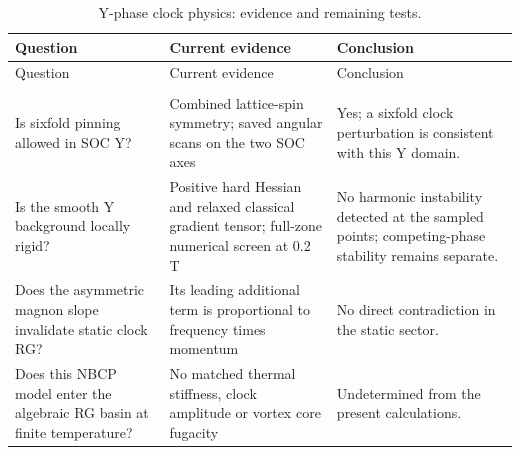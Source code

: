 \begingroup
\setlength{\LTpre}{0pt}
\setlength{\LTpost}{4pt}
\captionsetup{skip=4pt}
\begin{longtable}[]{@{}
  >{\raggedright\arraybackslash}p{}
  >{\raggedright\arraybackslash}p{}
  >{\raggedright\arraybackslash}p{}@{}}
\toprule\noalign{}
\begin{minipage}[b]{\linewidth}\raggedright
Question
\end{minipage} & \begin{minipage}[b]{\linewidth}\raggedright
Current evidence
\end{minipage} & \begin{minipage}[b]{\linewidth}\raggedright
Conclusion
\end{minipage} \\
\midrule\noalign{}
\endfirsthead
\toprule\noalign{}
\begin{minipage}[b]{\linewidth}\raggedright
Question
\end{minipage} & \begin{minipage}[b]{\linewidth}\raggedright
Current evidence
\end{minipage} & \begin{minipage}[b]{\linewidth}\raggedright
Conclusion
\end{minipage} \\
\midrule\noalign{}
\endhead
\bottomrule\noalign{}
\caption{Y-phase clock physics: evidence and remaining tests.}\label{tab-nbcp-07-y-phase-6}\\
\endlastfoot
Is sixfold pinning allowed in SOC Y? & Combined lattice-spin symmetry;
saved angular scans on the two SOC axes & Yes; a sixfold clock
perturbation is consistent with this Y domain. \\
Is the smooth Y background locally rigid? & Positive hard Hessian and
relaxed classical gradient tensor; full-zone numerical screen at 0.2 T &
No harmonic instability detected at the sampled points; competing-phase
stability remains separate. \\
Does the asymmetric magnon slope invalidate static clock RG? & Its
leading additional term is proportional to frequency times momentum & No
direct contradiction in the static sector. \\
Does this NBCP model enter the algebraic RG basin at finite temperature?
& No matched thermal stiffness, clock amplitude or vortex core fugacity
& Undetermined from the present calculations. \\
\end{longtable}
\endgroup

